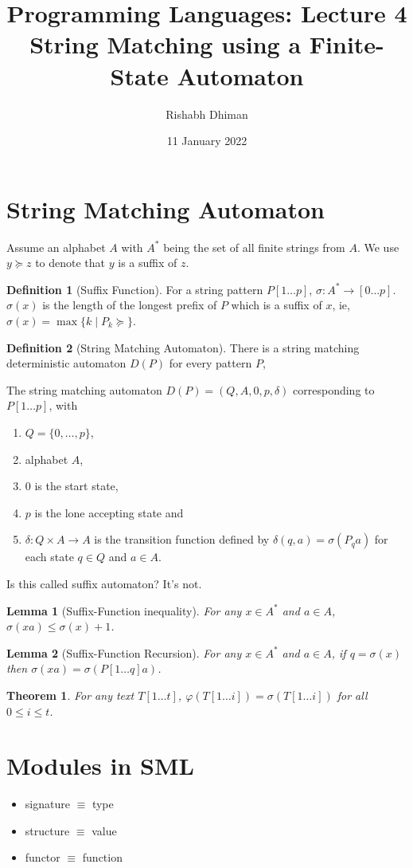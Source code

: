 \documentclass[a4paper]{scrartcl}
\title{
	Programming Languages: Lecture 4\\
	String Matching using a Finite-State Automaton
}
\author{Rishabh Dhiman}
\date{11 January 2022}
\newtheorem{theorem}{Theorem}
\newtheorem{lemma}{Lemma}
\theoremstyle{definition}
\newtheorem{definition}{Definition}
\begin{document}
\maketitle

\section{String Matching Automaton}
Assume an alphabet $A$ with $A^*$ being the set of all finite strings from $A$. We use $y \succeq z$ to denote that $y$ is a suffix of $z$.

\begin{definition}[Suffix Function]
	For a string pattern $P[1\dots p]$, $\sigma: A^* \to [0\dots p]$. $\sigma(x)$ is the length of the longest prefix of $P$ which is a suffix of $x$, ie, $\sigma(x) = \max\{k \mid P_k \succeq\}$.
\end{definition}

\begin{definition}[String Matching Automaton]
	There is a string matching deterministic automaton $D(P)$ for every pattern $P$,

	The string matching automaton $D(P) = (Q, A, 0, p, \delta)$ corresponding to $P[1\dots p]$, with
	\begin{enumerate}
		\item $Q = \{0, \dots, p\}$,
		\item alphabet $A$,
		\item $0$ is the start state,
		\item $p$ is the lone accepting state and
		\item $\delta: Q \times A \to A$ is the transition function defined by $\delta(q, a) = \sigma(P_qa)$ for each state $q \in Q$ and $a \in A$.
	\end{enumerate}
\end{definition}
Is this called suffix automaton? It's not.

\begin{lemma}[Suffix-Function inequality]
	For any $x \in A^*$ and $a \in A$, $\sigma(xa) \le \sigma(x) + 1$.
\end{lemma}

\begin{lemma}[Suffix-Function Recursion]
	For any $x \in A^*$ and $a \in A$, if $q = \sigma(x)$ then $\sigma(xa) = \sigma(P[1\dots q]a)$.
\end{lemma}

\begin{theorem}
	For any text $T[1\dots t]$, $\varphi(T[1\dots i]) = \sigma(T[1\dots i])$ for all $0 \le i \le t$.
\end{theorem}

\section{Modules in SML}
\begin{itemize}
	\item signature $\equiv$ type
	\item structure $\equiv$ value
	\item functor $\equiv$ function
\end{itemize}
\end{document}
